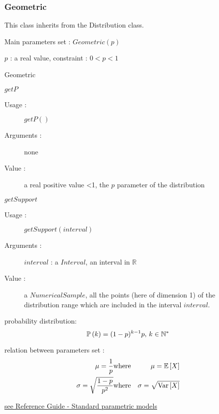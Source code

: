 \newpage \subsubsection{Geometric}

This class inherits from the Distribution class.

\begin{description}

\item[Usage :] Main parameters set : $Geometric(p)$

\item[Arguments :]  $p$ : a real value,
  constraint : $0<p<1$

\item[Value :] Geometric

\item[Some methods :] \rule{0pt}{1em}
  \begin{description}

  \item $getP$
    \begin{description}
    \item[Usage :] $getP()$
    \item[Arguments :] none
    \item[Value :]  a real positive value <1, the $p$ parameter of the  distribution
    \end{description}
    \bigskip

  \item $getSupport$
    \begin{description}
    \item[Usage :] $getSupport(interval)$
    \item[Arguments :] $interval$ : a $Interval$, an interval in $\mathbb{R}$
    \item[Value :]  a $NumericalSample$, all the points (here of dimension 1) of the distribution range which are included in the interval $interval$.
    \end{description}

  \end{description}

\item[Details :]  \rule{0pt}{1em}
  \begin{description}
  \item probability distribution:
    $$
    {\mathbb P}\left( k \right)  = (1-p)^{k-1} p, \, k\in \mathbb{N}^*
    $$
  \item relation between parameters set :
    \begin{eqnarray*}
      \mu  =   \frac{1}{p}                                              & \mbox{where}& \mu ={\mathbb E}\left[ X \right] \\
      \sigma  = \sqrt{\frac{1-p}{p^2}}  & \mbox{where}& \sigma =\sqrt{{\rm Var}\left[ X \right] }
    \end{eqnarray*}

  \end{description}
  \bigskip

\item[Links :]  \rule{0pt}{1em}
  \href{OpenTURNS_ReferenceGuide.pdf}{see Reference Guide - Standard parametric models}
\end{description}


